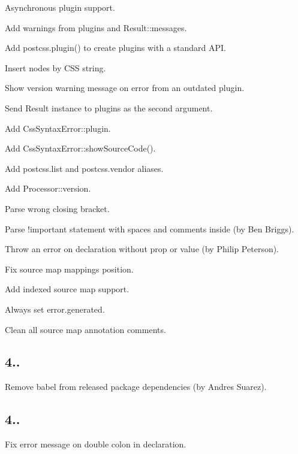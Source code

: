 \begin{DoxyItemize}
\item Asynchronous plugin support.
\item Add warnings from plugins and {\ttfamily Result\+::messages}.
\item Add {\ttfamily postcss.\+plugin()} to create plugins with a standard A\+PI.
\item Insert nodes by C\+SS string.
\item Show version warning message on error from an outdated plugin.
\item Send {\ttfamily Result} instance to plugins as the second argument.
\item Add {\ttfamily Css\+Syntax\+Error\+::plugin}.
\item Add {\ttfamily Css\+Syntax\+Error\+::show\+Source\+Code()}.
\item Add {\ttfamily postcss.\+list} and {\ttfamily postcss.\+vendor} aliases.
\item Add {\ttfamily Processor\+::version}.
\item Parse wrong closing bracket.
\item Parse {\ttfamily !important} statement with spaces and comments inside (by Ben Briggs).
\item Throw an error on declaration without {\ttfamily prop} or {\ttfamily value} (by Philip Peterson).
\item Fix source map mappings position.
\item Add indexed source map support.
\item Always set {\ttfamily error.\+generated}.
\item Clean all source map annotation comments.
\end{DoxyItemize}

\subsection*{4..}


\begin{DoxyItemize}
\item Remove {\ttfamily babel} from released package dependencies (by Andres Suarez).
\end{DoxyItemize}

\subsection*{4..}


\begin{DoxyItemize}
\item Fix error message on double colon in declaration.
\end{DoxyItemize}

